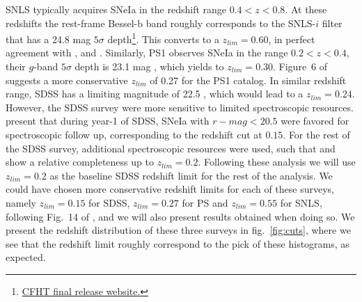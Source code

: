 \documentclass[]{aa} %
\begin{document}
SNLS typically acquires SNeIa in the redshift range $0.4<z<0.8$. At these
redshifts the rest-frame Bessel-b band roughly corresponds to the SNLS-$i$
filter that has a 24.8 mag $5\sigma$
depth\footnote{\href{https://www.cfht.hawaii.edu/Science/CFHTLS/cfhtlsfinalreleaseexecsummary.html}{CFHT
final release website.}}. This converts to a $z_{lim}=0.60$, in perfect
agreement with \cite{neill2006}, \cite{perrett2010} and \cite{bazin2011}.
Similarly, PS1 observes SNeIa in the range $0.2<z<0.4$, their $g$-band $5\sigma$
depth is 23.1 mag \citep{rest2014}, which yields to $z_{lim}=0.30$.  Figure~6 of
\citep{scolnic2018a} suggests a more conservative $z_{lim}$ of 0.27 for the PS1
catalog.  In similar redshift range, SDSS has a limiting magnitude of 22.5
\citep{dilday2008,sako2008}, which would lead to a $z_{lim}=0.24$. However, the
SDSS survey were more sensitive to limited spectroscopic resources.
\cite{kessler2009} present that during year-1 of SDSS, SNeIa with $r-mag<20.5$
were favored for spectroscopic follow up, corresponding to the redshift cut at
$0.15$. For the rest of the SDSS survey, additional spectroscopic resources were
used, such that \cite{kessler2009} and \cite{dilday2008} show a relative
completeness up to $z_{lim}=0.2$.  Following these analysis we will use
$z_{lim}=0.2$ as the baseline SDSS redshift limit for the rest of the analysis.
We could have chosen more conservative redshift limits for each of these
surveys, namely $z_{lim}=0.15$ for SDSS, $z_{lim}=0.27$ for PS and
$z_{lim}=0.55$ for SNLS, following Fig.~14 of \citealt{perrett2010}, and we will
also present results obtained when doing so.  We present the redshift
distribution of these three surveys in fig.~\ref{fig:cuts}, where we see that
the redshift limit roughly correspond to the pick of these histograms, as
expected.
\end{document}
